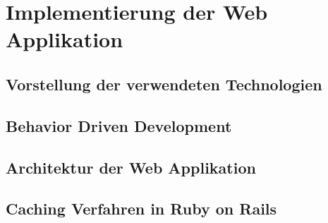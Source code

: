 \chapter{Implementierung der Web Applikation}
\section{Vorstellung der verwendeten Technologien}
\section{Behavior Driven Development}
\section{Architektur der Web Applikation}
\section{Caching Verfahren in Ruby on Rails}

